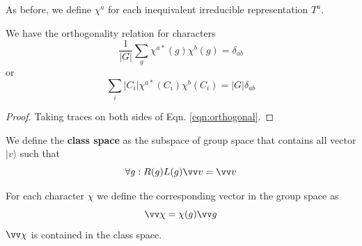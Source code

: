 \documentclass[12pt]{book}
\begin{document}
	As before, we define $\chi^a$ for each inequivalent irreducible representation $T^a$.
	
	\begin{lemma}
		We have the orthogonality relation for characters
	\begin{equation}
		\frac 1{|G|}\sum_g\chi^{a*}(g)\chi^b(g)=\delta_{ab}
	\end{equation}	
	or
	\begin{equation}
		\sum_i|C_i|\chi^{a*}(C_i)\chi^b(C_i)=|G|\delta_{ab}
	\end{equation}	
	\end{lemma}
	\begin{proof}
		Taking traces on both sides of Eqn. \ref{eqn:orthogonal}.
	\end{proof}
	
	\begin{definition}
	We define the {\bf class space} as the subspace of group space that contains all vector $|v\rangle$ such that
	\begin{equation}
		\forall g:R(g)L(g)\vv v=\vv v
	\end{equation}
	\end{definition}
	
	\begin{lemma}
	For each character $\chi$ we define the corresponding vector in the group space as
	\begin{equation}
		\vv \chi=\chi(g)\vv g
	\end{equation}
	$\vv \chi$ is contained in the class space.
	\end{lemma}
	
\end{document}
